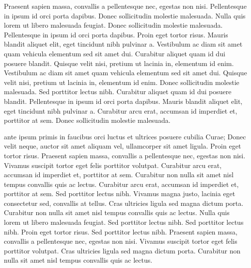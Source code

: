 \documentclass{article}
\begin{document}
Praesent sapien massa, convallis a pellentesque nec, egestas non nisi. Pellentesque in ipsum id orci porta dapibus. Donec sollicitudin molestie malesuada. Nulla quis lorem ut libero malesuada feugiat. Donec sollicitudin molestie malesuada. Pellentesque in ipsum id orci porta dapibus. Proin eget tortor risus. Mauris blandit aliquet elit, eget tincidunt nibh pulvinar a. Vestibulum ac diam sit amet quam vehicula elementum sed sit amet dui. Curabitur aliquet quam id dui posuere blandit. Quisque velit nisi, pretium ut lacinia in, elementum id enim. Vestibulum ac diam sit amet quam vehicula elementum sed sit amet dui. Quisque velit nisi, pretium ut lacinia in, elementum id enim. Donec sollicitudin molestie malesuada. Sed porttitor lectus nibh. Curabitur aliquet quam id dui posuere blandit. Pellentesque in ipsum id orci porta dapibus. Mauris blandit aliquet elit, eget tincidunt nibh pulvinar a. Curabitur arcu erat, accumsan id imperdiet et, porttitor at sem. Donec sollicitudin molestie malesuada.

 ante ipsum primis in faucibus orci luctus et ultrices posuere cubilia Curae; Donec velit neque, auctor sit amet aliquam vel, ullamcorper sit amet ligula. Proin eget tortor risus. Praesent sapien massa, convallis a pellentesque nec, egestas non nisi. Vivamus suscipit tortor eget felis porttitor volutpat. Curabitur arcu erat, accumsan id imperdiet et, porttitor at sem. Curabitur non nulla sit amet nisl tempus convallis quis ac lectus. Curabitur arcu erat, accumsan id imperdiet et, porttitor at sem. Sed porttitor lectus nibh. Vivamus magna justo, lacinia eget consectetur sed, convallis at tellus. Cras ultricies ligula sed magna dictum porta. Curabitur non nulla sit amet nisl tempus convallis quis ac lectus. Nulla quis lorem ut libero malesuada feugiat. Sed porttitor lectus nibh. Sed porttitor lectus nibh. Proin eget tortor risus. Sed porttitor lectus nibh. Praesent sapien massa, convallis a pellentesque nec, egestas non nisi. Vivamus suscipit tortor eget felis porttitor volutpat. Cras ultricies ligula sed magna dictum porta. Curabitur non nulla sit amet nisl tempus convallis quis ac lectus.

\endnumbering
\end{document}
